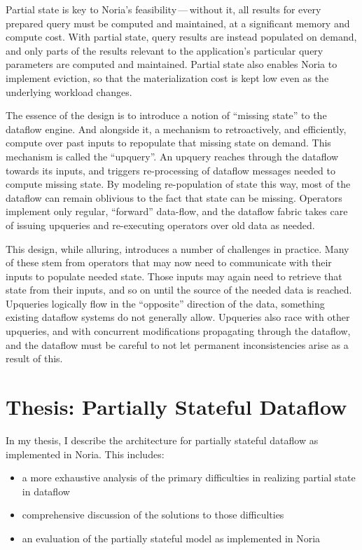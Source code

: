 \documentclass[fontsize=12pt,paper=letter]{scrartcl}
\begin{document}
Partial state is key to Noria's feasibility\,---\,without it, all results for
every prepared query must be computed and maintained, at a significant memory
and compute cost. With partial state, query results are instead populated on
demand, and only parts of the results relevant to the application's particular
query parameters are computed and maintained. Partial state also enables Noria
to implement eviction, so that the materialization cost is kept low even as the
underlying workload changes.

The essence of the design is to introduce a notion of ``missing state'' to the
dataflow engine. And alongside it, a mechanism to retroactively, and
efficiently, compute over past inputs to repopulate that missing state on
demand. This mechanism is called the ``upquery''. An upquery reaches through the
dataflow towards its inputs, and triggers re-processing of dataflow messages
needed to compute missing state. By modeling re-population of state this way,
most of the dataflow can remain oblivious to the fact that state can be missing.
Operators implement only regular, ``forward'' data-flow, and the dataflow fabric
takes care of issuing upqueries and re-executing operators over old data as
needed.

This design, while alluring, introduces a number of challenges in practice. Many
of these stem from operators that may now need to communicate with their inputs
to populate needed state. Those inputs may again need to retrieve that state
from their inputs, and so on until the source of the needed data is reached.
Upqueries logically flow in the ``opposite'' direction of the data, something
existing dataflow systems do not generally allow. Upqueries also race with other
upqueries, and with concurrent modifications propagating through the dataflow,
and the dataflow must be careful to not let permanent inconsistencies arise as a
result of this.

\section{Thesis: Partially Stateful Dataflow}

In my thesis, I describe the architecture for partially stateful dataflow as
implemented in Noria. This includes:

\begin{itemize}

 \item a more exhaustive analysis of the primary difficulties in realizing
	 partial state in dataflow
 \item comprehensive discussion of the solutions to those difficulties
 \item an evaluation of the partially stateful model as implemented in Noria
\end{itemize}
\end{document}
